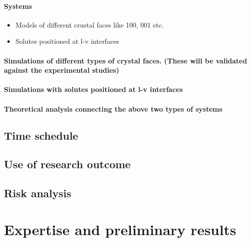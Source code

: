 \documentclass[a4paper,12pt,single,pdftex]{scrartcl}
\begin{document}
\label{ID_1103117492}\paragraph{Systems}

\begin{itemize}
\label{ID_190203064}\item Models of different crustal faces like 100, 001 etc.
\label{ID_808283525}\item Solutes positioned at l-v interfaces
\end{itemize}
\label{ID_190203064}\label{ID_808283525}\label{ID_1619461814}\paragraph{Simulations of different types of crystal faces. (These will be validated against the experimental studies)}

\label{ID_1547495769}\paragraph{Simulations with solutes positioned at l-v interfaces}

\label{ID_1538917616}\paragraph{Theoretical analysis connecting the above two types of systems}

\label{ID_581300306}\subsection{Time schedule}

\label{ID_1195711759}\subsection{Use of research outcome}

\label{ID_1268337594}\subsection{Risk analysis}

\label{ID_392987275}\subsection{}

\label{ID_3125732}\section{Expertise and preliminary results}
\end{document}
